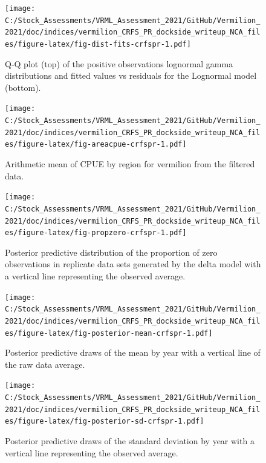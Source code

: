 \documentclass[11pt,
  english,
  a4paper,
]{article}
\begin{document}
\FloatBarrier

\FloatBarrier

\begin{figure}
\centering
\texttt{[image: C:/Stock\_Assessments/VRML\_Assessment\_2021/GitHub/Vermilion\_2021/doc/indices/vermilion\_CRFS\_PR\_dockside\_writeup\_NCA\_files/figure-latex/fig-dist-fits-crfspr-1.pdf]}
\caption{\label{fig:fig-dist-fits-crfspr}Q-Q plot (top) of the positive observations lognormal gamma distributions and fitted values vs residuals for the Lognormal model (bottom).}
\end{figure}

\begin{figure}
\centering
\texttt{[image: C:/Stock\_Assessments/VRML\_Assessment\_2021/GitHub/Vermilion\_2021/doc/indices/vermilion\_CRFS\_PR\_dockside\_writeup\_NCA\_files/figure-latex/fig-areacpue-crfspr-1.pdf]}
\caption{\label{fig:fig-areacpue-crfspr}Arithmetic mean of CPUE by region for vermilion from the filtered data.}
\end{figure}

\begin{figure}
\centering
\texttt{[image: C:/Stock\_Assessments/VRML\_Assessment\_2021/GitHub/Vermilion\_2021/doc/indices/vermilion\_CRFS\_PR\_dockside\_writeup\_NCA\_files/figure-latex/fig-propzero-crfspr-1.pdf]}
\caption{\label{fig:fig-propzero-crfspr}Posterior predictive distribution of the proportion of zero observations in replicate data sets generated by the delta model with a vertical line representing the observed average.}
\end{figure}

\begin{figure}
\centering
\texttt{[image: C:/Stock\_Assessments/VRML\_Assessment\_2021/GitHub/Vermilion\_2021/doc/indices/vermilion\_CRFS\_PR\_dockside\_writeup\_NCA\_files/figure-latex/fig-posterior-mean-crfspr-1.pdf]}
\caption{\label{fig:fig-posterior-mean-crfspr}Posterior predictive draws of the mean by year with a vertical line of the raw data average.}
\end{figure}

\begin{figure}
\centering
\texttt{[image: C:/Stock\_Assessments/VRML\_Assessment\_2021/GitHub/Vermilion\_2021/doc/indices/vermilion\_CRFS\_PR\_dockside\_writeup\_NCA\_files/figure-latex/fig-posterior-sd-crfspr-1.pdf]}
\caption{\label{fig:fig-posterior-sd-crfspr}Posterior predictive draws of the standard deviation by year with a vertical line representing the observed average.}
\end{figure}
\end{document}

